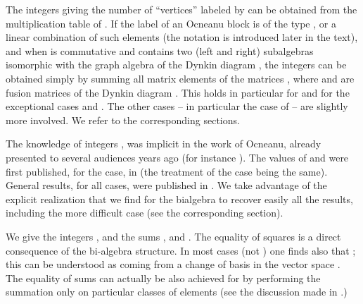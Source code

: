 \documentclass[a4paper,11pt]{article}
\def \otimesdot {\stackrel{\cdot}{\otimes}}
\begin{document}
The integers \coordHE{} giving the number of ``vertices'' labeled by
\coordHE{} can be obtained from the multiplication table of \coordHE{}.
If the label \coordHE{} of an Ocneanu block
is of the type \myHighlight{$a \otimesdot b$}\coordHE{}, or a linear combination of such elements
(the notation \myHighlight{$\otimesdot$}\coordHE{} is
introduced later in the text), and
when \coordHE{} is commutative and contains two (left and right)
subalgebras  isomorphic with the graph algebra of the Dynkin diagram \coordHE{},
the integers \myHighlight{$d_{x} = d_{a \otimesdot b}$}\coordHE{} can be obtained simply by
summing all matrix elements \coordHE{} of the matrices
\coordHE{}, where \coordHE{} and \coordHE{} are fusion matrices
of the Dynkin diagram \coordHE{}. This holds in particular for \coordHE{} and
for the exceptional cases \coordHE{} and \coordHE{}.
The other cases -- in particular the case of \coordHE{} -- are slightly more
involved. We refer to the corresponding sections.

The knowledge of integers \coordHE{}, \coordHE{} was implicit in the work
of Ocneanu, already presented to several audiences years ago (for
instance \cite{Ocneanu:Marseille}). The values of \coordHE{} and \coordHE{}
were first published, for the \coordHE{} case, in \cite{Coque:qtetra} (the
treatment  of the \coordHE{} case being the same). General results, for all
cases, were published in \cite{PetZub:Oc}.
We take advantage of the explicit realization that we
find for the bialgebra \coordHE{} to recover easily all the
results, including the more difficult \coordHE{} case (see the
corresponding section).

We give the integers \coordHE{}, \coordHE{} and the sums
\coordHE{}, \coordHE{} and \coordHE{}.
The equality of squares is a direct consequence of the bi-algebra
structure. In most cases (not \coordHE{}) one finds also that \coordHE{}; this can be understood as coming from a change of basis in
the vector
space \coordHE{}. The equality of sums can actually be also
achieved for \coordHE{} by performing the summation only on particular
classes of elements (see the discussion made in \cite{PetZub:Oc}.)
\end{document}

